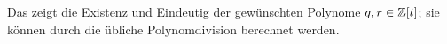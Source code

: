 Das zeigt die Existenz und Eindeutig der gewünschten Polynome $q, r \in \mathbb{Z}[t]$;
sie können durch die übliche Polynomdivision berechnet werden.




































